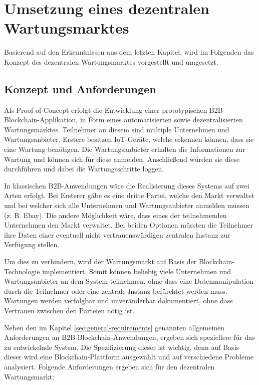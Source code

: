 \chapter{Umsetzung eines dezentralen Wartungsmarktes}
\label{cha:wartungsmarkt-impl}

Basierend auf den Erkenntnissen aus dem letzten Kapitel, wird im Folgenden das Konzept des dezentralen Wartungsmarktes vorgestellt und umgesetzt.

\section{Konzept und Anforderungen}
Als Proof-of-Concept erfolgt die Entwicklung einer prototypischen B2B-Blockchain-Applikation, in Form eines automatisierten sowie dezentralisierten Wartungsmarktes. Teilnehmer an diesem sind multiple Unternehmen und Wartungsanbieter. Erstere besitzen IoT-Geräte, welche erkennen können, dass sie eine Wartung benötigen. Die Wartungsanbieter erhalten die Informationen zur Wartung und können sich für diese anmelden. Anschließend würden sie diese durchführen und dabei die Wartungsschritte loggen.  

In klassischen B2B-Anwendungen wäre die Realisierung dieses Systems auf zwei Arten erfolgt. Bei Ersterer gäbe es eine dritte Partei, welche den Markt verwaltet und bei welcher sich alle Unternehmen und Wartungsanbieter anmelden müssen (z. B. Ebay). Die andere Möglichkeit wäre, dass eines der teilnehmenden Unternehmen den Markt verwaltet. Bei beiden Optionen müssten die Teilnehmer ihre Daten einer eventuell nicht vertrauenswürdigen zentralen Instanz zur Verfügung stellen.

Um dies zu verhindern, wird der Wartungsmarkt auf Basis der Blockchain-Technologie implementiert. Somit können beliebig viele Unternehmen und Wartungsanbieter an dem System teilnehmen, ohne dass eine Datenmanipulation durch die Teilnehmer oder eine zentrale Instanz befürchtet werden muss. Wartungen werden verfolgbar und unveränderbar dokumentiert, ohne dass Vertrauen zwischen den Parteien nötig ist.

Neben den im Kapitel \ref{sec:general-requirements} genannten allgemeinen Anforderungen an B2B-Blockchain-Anwendungen, ergeben sich speziellere für das zu entwickelnde System. Die Spezifizierung dieser ist wichtig, denn auf Basis dieser wird eine Blockchain-Plattform ausgewählt und auf verschiedene Probleme analysiert. Folgende Anforderungen ergeben sich für den dezentralen Wartungsmarkt:


